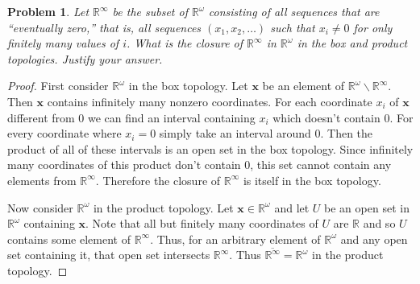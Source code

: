 \documentclass{article}
\newtheorem{problem}{Problem}
\begin{document}
\begin{problem}
Let $\mathbb{R}^{\infty}$ be the subset of $\mathbb{R}^{\omega}$ consisting of all sequences that are ``eventually zero,'' that is, all sequences $(x_1, x_2, \dots )$ such that $x_i \neq 0$ for only finitely many values of $i$. What is the closure of $\mathbb{R}^{\infty}$ in $\mathbb{R}^{\omega}$ in the box and product topologies. Justify your answer.
\end{problem}
\begin{proof}
First consider $\mathbb{R}^{\omega}$ in the box topology. Let $\mathbf{x}$ be an element of $\mathbb{R}^{\omega} \backslash \mathbb{R}^{\infty}$. Then $\mathbf{x}$ contains infinitely many nonzero coordinates. For each coordinate $x_i$ of $\mathbf{x}$ different from $0$ we can find an interval containing $x_i$ which doesn't contain $0$. For every coordinate where $x_i = 0$ simply take an interval around $0$. Then the product of all of these intervals is an open set in the box topology. Since infinitely many coordinates of this product don't contain $0$, this set cannot contain any elements from $\mathbb{R}^{\infty}$. Therefore the closure of $\mathbb{R}^{\infty}$ is itself in the box topology.

Now consider $\mathbb{R}^{\omega}$ in the product topology. Let $\mathbf{x} \in \mathbb{R}^{\omega}$ and let $U$ be an open set in $\mathbb{R}^{\omega}$ containing $\mathbf{x}$. Note that all but finitely many coordinates of $U$ are $\mathbb{R}$ and so $U$ contains some element of $\mathbb{R}^{\infty}$. Thus, for an arbitrary element of $\mathbb{R}^{\omega}$ and any open set containing it, that open set intersects $\mathbb{R}^{\infty}$. Thus $\overline{\mathbb{R}^{\infty}} = \mathbb{R}^{\omega}$ in the product topology.
\end{proof}
\end{document}
